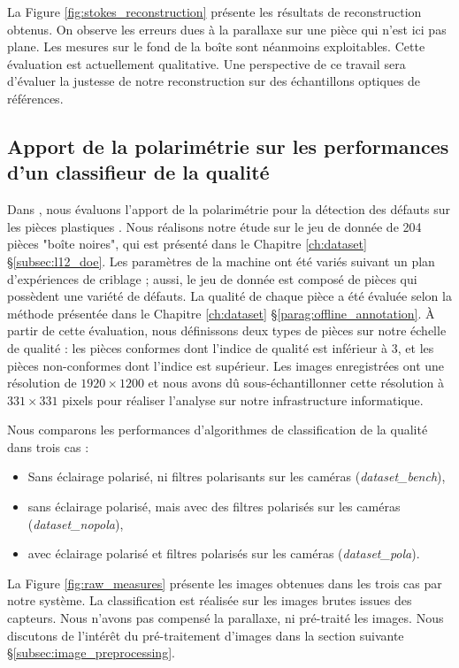 La Figure \ref{fig:stokes_reconstruction} présente les résultats de reconstruction obtenus.
On observe les erreurs dues à la parallaxe sur une pièce qui n'est ici pas plane.
Les mesures sur le fond de la boîte sont néanmoins exploitables.
Cette évaluation est actuellement qualitative.
Une perspective de ce travail sera d'évaluer la justesse de notre reconstruction sur des échantillons optiques de références.


\subsection{Apport de la polarimétrie sur les performances d'un classifieur de la qualité}
\label{subsubsec:pola_results}

Dans , nous évaluons l'apport de la polarimétrie pour la détection des défauts sur les pièces plastiques \cite{nagorny_polarimetric_2019}.
Nous réalisons notre étude sur le jeu de donnée de 204 pièces "boîte noires", qui est présenté dans le Chapitre \ref{ch:dataset} §\ref{subsec:l12_doe}.
Les paramètres de la machine ont été variés suivant un plan d'expériences de criblage ; aussi, le jeu de donnée est composé de pièces qui possèdent une variété de défauts.
La qualité de chaque pièce a été évaluée selon la méthode présentée dans le Chapitre \ref{ch:dataset} §\ref{parag:offline_annotation}.
À partir de cette évaluation, nous définissons deux types de pièces sur notre échelle de qualité : les pièces conformes dont l'indice de qualité est inférieur à 3, et les pièces non-conformes dont l'indice est supérieur.
Les images enregistrées ont une résolution de $1920 \times 1200$ et nous avons dû sous-échantillonner cette résolution à $331 \times 331$ pixels pour réaliser l'analyse sur notre infrastructure informatique.

Nous comparons les performances d'algorithmes de classification de la qualité dans trois cas :
\begin{itemize}
	\item 
	Sans éclairage polarisé, ni filtres polarisants sur les caméras (\textit{dataset\_bench}),
	\item 
	sans éclairage polarisé, mais avec des filtres polarisés sur les caméras (\textit{dataset\_nopola}),
	\item avec éclairage polarisé et filtres polarisés sur les caméras (\textit{dataset\_pola}).
\end{itemize}
La Figure \ref{fig:raw_measures} présente les images obtenues dans les trois cas par notre système.
La classification est réalisée sur les images brutes issues des capteurs.
Nous n'avons pas compensé la parallaxe, ni pré-traité les images.
Nous discutons de l'intérêt du pré-traitement d'images dans la section suivante §\ref{subsec:image_preprocessing}.

